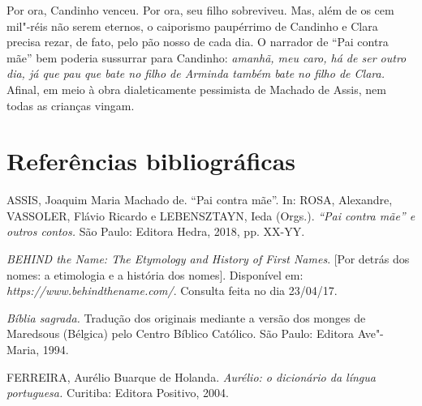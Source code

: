 Por ora, Candinho venceu. Por ora, seu filho sobreviveu. Mas, além de os
cem mil"-réis não serem eternos, o caiporismo paupérrimo de Candinho e
Clara precisa rezar, de fato, pelo pão nosso de cada dia. O narrador de
``Pai contra mãe'' bem poderia sussurrar para Candinho: \emph{amanhã,
meu caro, há de ser outro dia, já que pau que bate no filho de Arminda
também bate no filho de Clara.} Afinal, em meio à obra dialeticamente
pessimista de Machado de Assis, nem todas as crianças vingam.

\section{Referências bibliográficas}

ASSIS, Joaquim Maria Machado de. ``Pai contra mãe''. In: ROSA,
Alexandre, VASSOLER, Flávio Ricardo e LEBENSZTAYN, Ieda (Orgs.).
\emph{``Pai contra mãe'' e outros contos.} São Paulo: Editora Hedra,
2018, pp. XX-YY.

\emph{BEHIND the Name: The Etymology and History of First Names}. [Por
detrás dos nomes: a etimologia e a história dos nomes]. Disponível em:
\emph{https://www.behindthename.com/}.
Consulta feita no dia 23/04/17.

\emph{Bíblia sagrada.} Tradução dos originais mediante a versão dos
monges de Maredsous (Bélgica) pelo Centro Bíblico Católico. São Paulo:
Editora Ave"-Maria, 1994.

FERREIRA, Aurélio Buarque de Holanda. \emph{Aurélio: o dicionário da
língua portuguesa.} Curitiba: Editora Positivo, 2004.